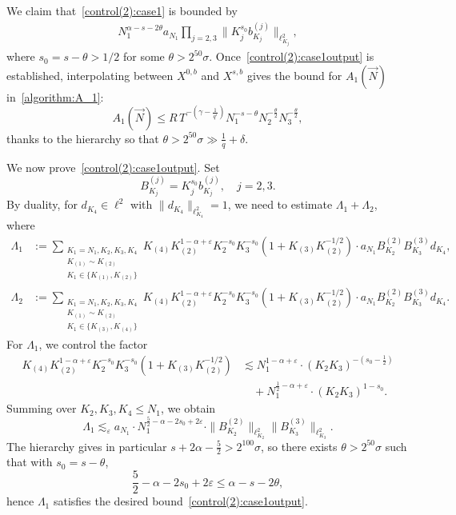 \documentclass[11pt,reqno,english]{amsart}
\numberwithin{equation}{section}
\theoremstyle{plain}
\theoremstyle{definition}
\theoremstyle{remark}
\renewcommand{\epsilon}{\varepsilon}
\begin{document}
We claim that~\eqref{control(2):case1} is bounded by
\begin{align}\label{control(2):case1output}
	N_1^{\alpha-s-2\theta}a_{N_1} \prod_{j=2,3}\|K^{s_0}_j b_{K_j}^{(j)}\|_{\ell_{K_j}^2},
\end{align}
where $s_0=s-\theta>1/2$ for some $\theta>2^{50}\sigma$.
Once~\eqref{control(2):case1output} is established, interpolating between $X^{0,b}$ and $X^{s,b}$ gives the bound for $A_1(\vec{N})$ in~\eqref{algorithm:A_1}:
\[
A_1(\vec{N})\leq R\, T^{-(\gamma-\frac{1}{q'})}N_1^{-s-\theta}N_2^{-\frac{\theta}{2}}N_3^{-\frac{\theta}{2}},
\]
thanks to the hierarchy so that $\theta>2^{50}\sigma\gg \frac{1}{q}+\delta$.

\medskip
We now prove~\eqref{control(2):case1output}. Set
\[
B_{K_j}^{(j)}=K_j^{s_0}b_{K_j}^{(j)}, \quad j=2,3.
\]
By duality, for $d_{K_4}\in\ell^2$ with $\|d_{K_4}\|_{\ell_{K_4}^2}=1$,
we need to estimate $\Lambda_1+\Lambda_2$, where
\begin{align*}
	\Lambda_1&:=\sum_{\substack{K_1=N_1, K_2,K_3,K_4\\
			K_{(1)}\sim K_{(2)}\\
			K_1\in\{K_{(1)},K_{(2)}\}
	}} K_{(4)}K_{(2)}^{1-\alpha+\epsilon}K_2^{-s_0}K_3^{-s_0}(1+K_{(3)}K_{(2)}^{-1/2})\cdot a_{N_1}B_{K_2}^{(2)}B_{K_3}^{(3)}d_{K_4},\\
	\Lambda_2&:=\sum_{\substack{K_1=N_1, K_2,K_3,K_4\\
			K_{(1)}\sim K_{(2)}\\
			K_1\in\{K_{(3)},K_{(4)}\}
	}} K_{(4)}K_{(2)}^{1-\alpha+\epsilon}K_2^{-s_0}K_3^{-s_0}(1+K_{(3)}K_{(2)}^{-1/2})\cdot a_{N_1}B_{K_2}^{(2)}B_{K_3}^{(3)}d_{K_4}.
\end{align*}
For $\Lambda_1$, we control the factor
\begin{align*}
	K_{(4)}K_{(2)}^{1-\alpha+\epsilon}K_{2}^{-s_0}K_3^{-s_0}(1+K_{(3)}K_{(2)}^{-1/2})&\lesssim N_1^{1-\alpha+\epsilon}\cdot (K_2 K_3)^{-(s_0-\frac{1}{2})}\\
	&\quad+N_1^{\frac{1}{2}-\alpha+\epsilon}\cdot (K_2 K_3)^{1-s_0}.
\end{align*}
Summing over $K_2,K_3,K_4\leq N_1$, we obtain
\[
\Lambda_1\lesssim_{\epsilon} a_{N_1}\cdot N_1^{\frac{5}{2}-\alpha-2s_0+2\epsilon}\cdot \|B_{K_2}^{(2)}\|_{\ell_{K_2}^2}
\|B_{K_3}^{(3)}\|_{\ell_{K_3}^2}.
\]
The hierarchy gives in particular $s+2\alpha-\frac{5}{2}>2^{100}\sigma$, so there exists $\theta>2^{50}\sigma$ such that with $s_0=s-\theta$,
\[
\frac{5}{2}-\alpha-2s_0+2\epsilon\leq \alpha-s-2\theta,
\]
hence $\Lambda_1$ satisfies the desired bound~\eqref{control(2):case1output}.
\end{document}
